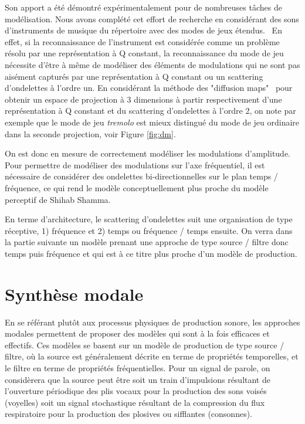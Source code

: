 Son apport a été démontré expérimentalement pour de nombreuses tâches de modélisation. Nous avons complété cet effort de recherche en considérant des sons d'instruments de musique du répertoire avec des modes de jeux étendus.~\cite{lostanlen2018extended} En effet, si la reconnaissance de l'instrument est considérée comme un problème résolu par une représentation à Q constant, la reconnaissance du mode de jeu nécessite d'être à même de modéliser des éléments de modulations qui ne sont pas aisément capturés par une représentation à Q constant ou un scattering d'ondelettes à l'ordre un. En considérant la méthode des "diffusion maps"~\cite{coifman2005geometric} pour obtenir un espace de projection à 3 dimensions à partir respectivement d'une représentation à Q constant et du scattering d'ondelettes à l'ordre 2, on note par exemple que le mode de jeu \textsl{tremolo} est mieux distingué du mode de jeu ordinaire dans la seconde projection, voir Figure \ref{fig:dm}.

On est donc en mesure de correctement modéliser les modulations d'amplitude. Pour permettre de modéliser des modulations sur l'axe fréquentiel, il est nécessaire de considérer des ondelettes bi-directionnelles sur le plan temps / fréquence, ce qui rend le modèle conceptuellement plus proche du modèle perceptif de Shihab Shamma.~\cite{8721532}

En terme d'architecture, le scattering d'ondelettes suit une organisation de type réceptive, 1) fréquence et 2) temps ou fréquence / temps ensuite. On verra dans la partie suivante un modèle prenant une approche de type source / filtre donc temps puis fréquence  et qui est à ce titre plus proche d'un modèle de production.

\section{ \nmu Synthèse modale}




En se référant plutôt aux processus physiques de production sonore, les approches modales permettent de proposer des modèles qui sont à la fois efficaces et effectifs. Ces modèles se basent sur un modèle de production de type source / filtre, où la source est généralement décrite en terme de propriétés temporelles, et le filtre en terme de propriétés fréquentielles. Pour un signal de parole, on considèrera que la source peut être soit un train d'impulsions résultant de l'ouverture périodique des plis vocaux pour la production des sons voisés (voyelles) soit un signal stochastique résultant de la compression du flux respiratoire pour la production des plosives ou sifflantes (consonnes).

